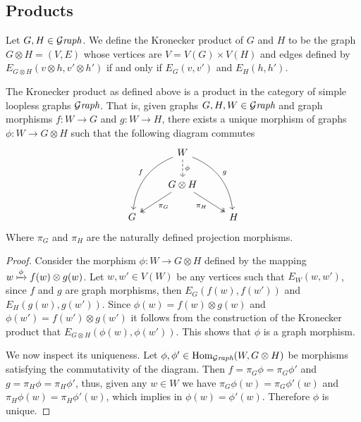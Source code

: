 \subsection{Products}

\begin{definition}
  Let \(G, H \in {\mathcal{G}\textit{raph}}\). We define the Kronecker product of \(G\) and \(H\) to
  be the graph \(G \otimes H = (V, E)\) whose vertices are \(V = V(G) \times
  V(H)\) and edges defined by \(E_{G \otimes H}(v \otimes h, v' \otimes h')\) if
  and only if \(E_G(v, v')\) and \(E_H(h, h')\).
\end{definition}

\begin{proposition}[Products]
  The Kronecker product as defined above is a product in the category of simple
  loopless graphs \({\mathcal{G}\textit{raph}}\). That is, given graphs \(G, H, W \in {\mathcal{G}\textit{raph}}\) and
  graph morphisms \(f: W \to G\) and \(g: W \to H\), there exists a unique
  morphism of graphs \(\phi: W \to G \otimes H\) such that the following diagram
  commutes
  \[
    \begin{tikzcd}
      &W \ar[d, dashed, "\phi"]
      \ar[ddl, bend right, swap, "f"]
      \ar[ddr, bend left, "g"]
      & \\
      &G \otimes H
      \ar[dr, two heads, swap, "\pi_H"]
      \ar[dl, two heads, "\pi_G"]
      & \\
      G & &H
    \end{tikzcd}
  \]
  Where \(\pi_G\) and \(\pi_H\) are the naturally defined projection morphisms.
\end{proposition}

\begin{proof}
  Consider the morphism \(\phi: W \to G \otimes H\) defined by the mapping \(w
  \xmapsto \phi f(w) \otimes g(w)\). Let \(w, w' \in V(W)\) be any vertices such
  that \(E_W(w, w')\), since \(f\) and \(g\) are graph morphisms, then
  \(E_G(f(w), f(w'))\) and \(E_H(g(w), g(w'))\). Since \(\phi(w) = f(w) \otimes
  g(w)\) and \(\phi(w') = f(w') \otimes g(w')\) it follows from the construction
  of the Kronecker product that \(E_{G \otimes H}(\phi(w), \phi(w'))\). This
  shows that \(\phi\) is a graph morphism.

  We now inspect its uniqueness. Let \(\phi, \phi' \in \operatorname{Hom}_{\mathcal{G}\textit{raph}}(W, G \otimes
  H)\) be morphisms satisfying the commutativity of the diagram. Then \(f =
  \pi_G \phi = \pi_G \phi'\) and \(g = \pi_H \phi = \pi_H \phi'\), thus, given
  any \(w \in W\) we have \(\pi_G\phi(w) = \pi_G \phi'(w)\) and \(\pi_H \phi(w)
  = \pi_H\phi'(w)\), which implies in \(\phi(w) = \phi'(w)\). Therefore \(\phi\)
  is unique.
\end{proof}

